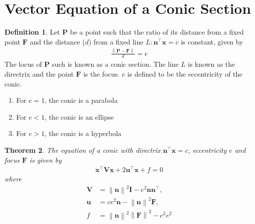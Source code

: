 \documentclass[]{interact}
\theoremstyle{plain}%
\newtheorem{theorem}{Theorem}[section]
\theoremstyle{definition}
\newtheorem{definition}[theorem]{Definition}
\theoremstyle{remark}
\providecommand{\norm}[1]{\left\lVert#1\right\rVert}
\let\vec\mathbf
\begin{document}
\section{Vector Equation of a Conic Section}
\begin{definition}
  Let $\vec{P}$ be a point such that the ratio of its distance from a fixed point $\vec{F}$ and the distance ($d$) from a fixed line 
$L: \vec{n}^{\top}\vec{x}=c$ is constant, given by 
\label{conics/30/def}
\begin{align}
\frac{\norm{\vec{P}-\vec{F}}}{d} = e    
\end{align}
The locus of $\vec{P}$ such is known as a conic section. The line $L$ is known as the directrix and the point $\vec{F}$ is the focus. $e$ is defined to be 
the eccentricity of the conic.  
\begin{enumerate}
    \item For $e = 1$, the conic is a parabola
    \item For $e < 1$, the conic is an ellipse
    \item For $e > 1$, the conic is a hyperbola
\end{enumerate}
\end{definition}
\begin{theorem}
The equation of  a conic with directrix $\vec{n}^{\top}\vec{x} = c$, eccentricity $e$ and focus $\vec{F}$ is given by 
\begin{align}
    \label{eq:conic_quad_form}
    \vec{x}^{\top}\vec{V}\vec{x}+2\vec{u}^{\top}\vec{x}+f=0
    \end{align}
where     
\begin{align}
  \label{eq:conic_quad_form_v}
\vec{V} &=\norm{\vec{n}}^2\vec{I}-e^2\vec{n}\vec{n}^{\top}, 
\\
\label{eq:conic_quad_form_u}
\vec{u} &= ce^2\vec{n}-\norm{\vec{n}}^2\vec{F}, 
\\
\label{eq:conic_quad_form_f}
f &= \norm{\vec{n}}^2\norm{\vec{F}}^2-c^2e^2
    \end{align}
    
%
\end{theorem}
\end{document}
